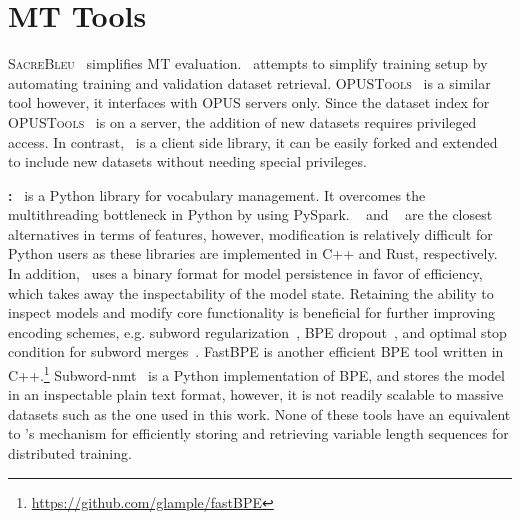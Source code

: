 \section{MT Tools}
\textsc{SacreBleu}~\cite{post-2018-sacrebleu} simplifies MT evaluation.
\mtdata\ attempts to simplify training setup by automating training and validation dataset retrieval.
\textsc{OPUSTools}~\cite{aulamo-etal-2020-opustools} is a similar tool however, it interfaces with OPUS servers only.
Since the dataset index for \textsc{OPUSTools}~ is on a server, the addition of new datasets requires privileged access.
In contrast, \mtdata\ is a client side library, it can be easily forked and extended to include new datasets without needing special privileges. 

\textbf{\nlcodec:} 
\nlcodec\ is a Python library for vocabulary management. It overcomes the multithreading bottleneck in Python by using PySpark.
\sentpiece~\cite{kudo-richardson-2018-sentencepiece} and \hftok~\cite{wolf-etal-2020-transformers} are the closest alternatives in terms of features, however, modification is relatively difficult for Python users as these libraries are implemented in C++ and Rust, respectively.
In addition, \sentpiece\ uses a binary format for model persistence in favor of efficiency, which takes away the inspectability of the model state. 
Retaining the ability to inspect models and modify core functionality is beneficial for further improving encoding schemes, e.g. subword regularization~\cite{kudo-2018-subwordreg}, BPE dropout~\cite{provilkov-etal-2020-bpedrop}, and optimal stop condition for subword merges~\cite{gowda-may-2020-finding}.
FastBPE is another efficient BPE tool written in C++.\footnote{\url{https://github.com/glample/fastBPE}}  
Subword-nmt~\cite{sennrich-etal-2016-bpe} is a Python implementation of BPE, and stores the model in an inspectable plain text format, however, it is not readily scalable to massive datasets such as the one used in this work.
None of these tools have an equivalent to \nldb's mechanism for efficiently storing and retrieving variable length sequences for distributed training.


